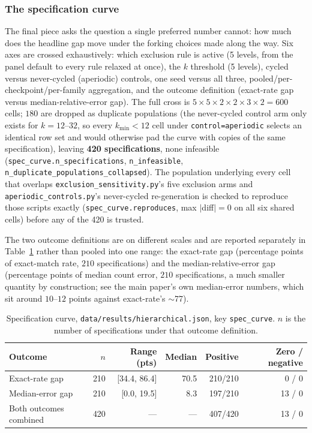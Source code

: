 \documentclass[11pt]{article}
\begin{document}
\subsubsection{The specification curve}

The final piece asks the question a single preferred number cannot: how much
does the headline gap move under the forking choices made along the way. Six
axes are crossed exhaustively: which exclusion rule is active (5 levels, from
the panel default to every rule relaxed at once), the $k$ threshold (5
levels), cycled versus never-cycled (aperiodic) controls, one seed versus all
three, pooled/per-checkpoint/per-family aggregation, and the outcome
definition (exact-rate gap versus median-relative-error gap). The full cross
is $5\times5\times2\times2\times3\times2=600$ cells; $180$ are dropped as
duplicate populations (the never-cycled control arm only exists for
$k=12$--$32$, so every $k_{\min}<12$ cell under \texttt{control=aperiodic}
selects an identical row set and would otherwise pad the curve with copies of
the same specification), leaving \textbf{420 specifications}, none infeasible
(\texttt{spec\_curve.n\_specifications}, \texttt{n\_infeasible},
\texttt{n\_duplicate\_populations\_collapsed}). The population underlying every
cell that overlaps \texttt{exclusion\_sensitivity.py}'s five exclusion arms and
\texttt{aperiodic\_controls.py}'s never-cycled re-generation is checked to
reproduce those scripts exactly (\texttt{spec\_curve.reproduces}, max
$|$diff$|=0$ on all six shared cells) before any of the 420 is trusted.

The two outcome definitions are on different scales and are reported
separately in Table~\ref{tab:hier-spec} rather than pooled into one range: the
exact-rate gap (percentage points of exact-match rate, $210$ specifications)
and the median-relative-error gap (percentage points of median count error,
$210$ specifications, a much smaller quantity by construction; see
the main paper's own median-error numbers, which sit around
$10$--$12$ points against exact-rate's $\sim$77).

\begin{table}[h]
\centering
\caption{Specification curve, \texttt{data/results/hierarchical.json}, key
\texttt{spec\_curve}. $n$ is the number of specifications under that outcome
definition.}
\label{tab:hier-spec}
\small
\begin{tabular}{@{}lrrrrr@{}}
\toprule
Outcome & $n$ & Range (pts) & Median & Positive & Zero / negative \\
\midrule
Exact-rate gap & 210 & [34.4, 86.4] & 70.5 & 210/210 & 0 / 0 \\
Median-error gap & 210 & [0.0, 19.5] & 8.3 & 197/210 & 13 / 0 \\
\midrule
Both outcomes combined & 420 & --- & --- & 407/420 & 13 / 0 \\
\bottomrule
\end{tabular}
\end{table}
\end{document}
